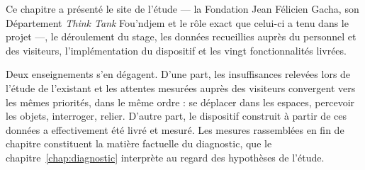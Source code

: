 \conclchap

Ce chapitre a présenté le site de l'étude — la Fondation Jean Félicien Gacha,
son Département \emph{Think Tank} Fou'ndjem et le rôle exact que celui-ci a tenu
dans le projet —, le déroulement du stage, les données recueillies auprès du
personnel et des visiteurs, l'implémentation du dispositif et les vingt
fonctionnalités livrées.

Deux enseignements s'en dégagent. D'une part, les insuffisances relevées lors de
l'étude de l'existant et les attentes mesurées auprès des visiteurs convergent
vers les mêmes priorités, dans le même ordre : se déplacer dans les espaces,
percevoir les objets, interroger, relier. D'autre part, le dispositif construit
à partir de ces données a effectivement été livré et mesuré. Les mesures rassemblées en fin de chapitre constituent la matière
factuelle du diagnostic, que le chapitre~\ref{chap:diagnostic} interprète au
regard des hypothèses de l'étude.
